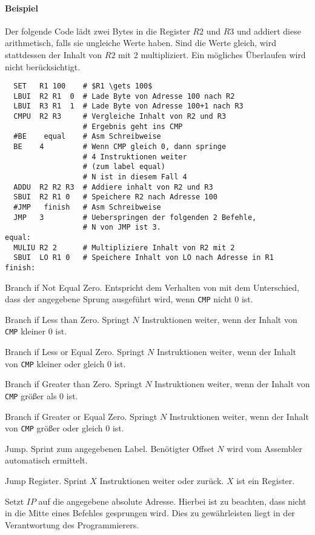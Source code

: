 \paragraph{Beispiel}
Der folgende Code lädt zwei Bytes in die Register $R2$ und $R3$ und addiert
diese arithmetisch, falls sie ungleiche Werte haben. Sind die Werte gleich,
wird stattdessen der Inhalt von $R2$ mit 2 multipliziert. Ein mögliches
Überlaufen wird nicht berücksichtigt.
\begin{lstlisting}
  SET   R1 100    # $R1 \gets 100$
  LBUI  R2 R1  0  # Lade Byte von Adresse 100 nach R2
  LBUI  R3 R1  1  # Lade Byte von Adresse 100+1 nach R3
  CMPU  R2 R3     # Vergleiche Inhalt von R2 und R3
                  # Ergebnis geht ins CMP
  #BE    equal    # Asm Schreibweise
  BE    4         # Wenn CMP gleich 0, dann springe 
                  # 4 Instruktionen weiter
                  # (zum label equal)
                  # N ist in diesem Fall 4
  ADDU  R2 R2 R3  # Addiere inhalt von R2 und R3
  SBUI  R2 R1 0   # Speichere R2 nach Adresse 100
  #JMP   finish   # Asm Schreibweise
  JMP   3         # Ueberspringen der folgenden 2 Befehle, 
                  # N von JMP ist 3.
equal:
  MULIU R2 2      # Multipliziere Inhalt von R2 mit 2
  SBUI  LO R1 0   # Speichere Inhalt von LO nach Adresse in R1
finish:
\end{lstlisting}



\glqq Branch if Not Equal Zero\grqq. Entspricht dem Verhalten von  mit dem
Unterschied, dass der angegebene Sprung ausgeführt wird, wenn \texttt{CMP} nicht
$0$ ist.


\glqq Branch if Less than Zero\grqq. 
Springt $N$ Instruktionen weiter, wenn der Inhalt von \texttt{CMP} kleiner $0$
ist.


\glqq Branch if Less or Equal Zero\grqq.
Springt $N$ Instruktionen weiter, wenn der Inhalt von \texttt{CMP} kleiner oder
gleich $0$ ist.


\glqq Branch if Greater than Zero\grqq.
Springt $N$ Instruktionen weiter, wenn der Inhalt von \texttt{CMP} größer als
$0$ ist.


\glqq Branch if Greater or Equal Zero\grqq. 
Springt $N$ Instruktionen weiter, wenn der Inhalt von \texttt{CMP} größer oder
gleich $0$ ist.


\glqq Jump\grqq.
Sprint zum angegebenen Label. Benötigter Offset $N$ wird vom Assembler
automatisch ermittelt.

\glqq Jump Register\grqq.
Sprint $X$ Instruktionen weiter oder zurück.
$X$ ist ein Register.


Setzt $IP$ auf die angegebene absolute Adresse. Hierbei ist zu beachten, dass
nicht in die Mitte eines Befehles gesprungen wird. Dies zu gewährleisten liegt
in der Verantwortung des Programmierers.


